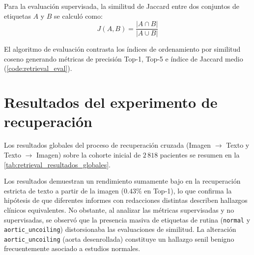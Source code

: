 \documentclass[../tesis.tex]{subfiles}
\begin{document}
Para la evaluación supervisada, la similitud de Jaccard entre dos conjuntos de etiquetas $A$ y $B$ se calculó como:
\begin{equation}
    J(A,B) = \frac{|A \cap B|}{|A \cup B|}
\end{equation}

El algoritmo de evaluación contrasta los índices de ordenamiento por similitud coseno generando métricas de precisión Top-1, Top-5 e índice de Jaccard medio (\autoref{code:retrieval_eval}).


\section{Resultados del experimento de recuperación}
\label{sec:resultados_retrieval}

Los resultados globales del proceso de recuperación cruzada (Imagen $\rightarrow$ Texto y Texto $\rightarrow$ Imagen) sobre la cohorte inicial de $2\,818$ pacientes se resumen en la \autoref{tab:retrieval_resultados_globales}.

\begin{table}[htbp]
\centering
\small
{}
\caption{Desempeño del sistema de recuperación multimodal con CheXzero sobre la base de $2\,818$ pacientes.}
\label{tab:retrieval_resultados_globales}
\end{table}

Los resultados demuestran un rendimiento sumamente bajo en la recuperación estricta de texto a partir de la imagen ($0.43\%$ en Top-1), lo que confirma la hipótesis de que diferentes informes con redacciones distintas describen hallazgos clínicos equivalentes. No obstante, al analizar las métricas supervisadas y no supervisadas, se observó que la presencia masiva de etiquetas de rutina (\texttt{normal} y \texttt{aortic\_uncoiling}) distorsionaba las evaluaciones de similitud. La alteración \texttt{aortic\_uncoiling} (aorta desenrollada) constituye un hallazgo senil benigno frecuentemente asociado a estudios normales.
\end{document}
